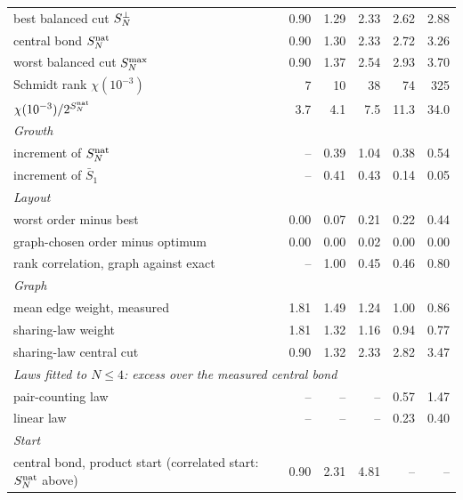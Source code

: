 \begin{table}[!ht]
\begin{tabular}{lrrrrr}
best balanced cut $S^{\perp}_N$ & 0.90 & 1.29 & 2.33 & 2.62 & 2.88 \\
central bond $S^{\mathrm{nat}}_N$ & 0.90 & 1.30 & 2.33 & 2.72 & 3.26 \\
worst balanced cut $S^{\max}_N$ & 0.90 & 1.37 & 2.54 & 2.93 & 3.70 \\
Schmidt rank $\chi(10^{-3})$ & 7 & 10 & 38 & 74 & 325 \\
$\chi(10^{-3})/2^{S^{\mathrm{nat}}_N}$ & 3.7 & 4.1 & 7.5 & 11.3 & 34.0 \\
\multicolumn{6}{l}{\emph{Growth}} \\
increment of $S^{\mathrm{nat}}_N$ & -- & 0.39 & 1.04 & 0.38 & 0.54 \\
increment of $\bar S_1$ & -- & 0.41 & 0.43 & 0.14 & 0.05 \\
\multicolumn{6}{l}{\emph{Layout}} \\
worst order minus best & 0.00 & 0.07 & 0.21 & 0.22 & 0.44 \\
graph-chosen order minus optimum & 0.00 & 0.00 & 0.02 & 0.00 & 0.00 \\
rank correlation, graph against exact & -- & 1.00 & 0.45 & 0.46 & 0.80 \\
\multicolumn{6}{l}{\emph{Graph}} \\
mean edge weight, measured & 1.81 & 1.49 & 1.24 & 1.00 & 0.86 \\
sharing-law weight & 1.81 & 1.32 & 1.16 & 0.94 & 0.77 \\
sharing-law central cut & 0.90 & 1.32 & 2.33 & 2.82 & 3.47 \\
\multicolumn{6}{l}{\emph{Laws fitted to $N\le4$: excess over the measured central bond}} \\
pair-counting law & -- & -- & -- & 0.57 & 1.47 \\
linear law & -- & -- & -- & 0.23 & 0.40 \\
\multicolumn{6}{l}{\emph{Start}} \\
central bond, product start (correlated start: $S^{\mathrm{nat}}_N$ above) & 0.90 & 2.31 & 4.81 & -- & -- \\
\bottomrule
\end{tabular}
\end{table}
